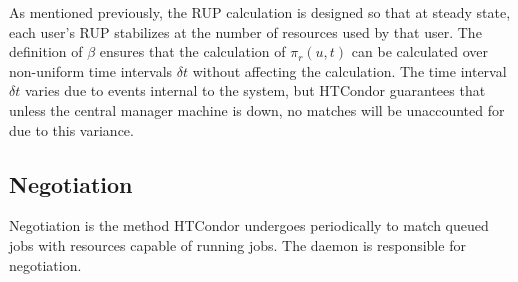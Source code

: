 As mentioned previously, the RUP calculation is designed so that at steady
state, each user's RUP stabilizes at the number of resources used by that user. 
The definition of $\beta$ ensures that the calculation of $\pi_r(u,t)$ can be 
calculated over non-uniform time intervals $\delta t$ without affecting the 
calculation.  The time interval $\delta t$ varies due to events internal to 
the system, but HTCondor guarantees that unless the central manager machine is 
down, no matches will be unaccounted for due to this variance.

%  

\subsection{\label{sec:negotiation}Negotiation}

Negotiation is the method HTCondor undergoes periodically to
match queued jobs with resources capable of running jobs.
The  daemon is responsible for
negotiation.

